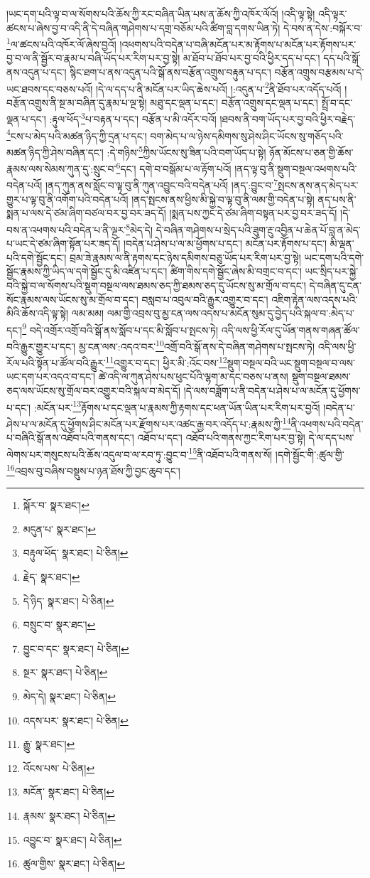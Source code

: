 །ཡང་དག་པའི་ལྟ་བ་ལ་སོགས་པའི་ཆོས་ཀྱི་རང་བཞིན་ཡིན་པས་ན་ཆོས་ཀྱི་འཁོར་ལོའོ། །འདི་ལྟ་སྟེ། འདི་ལྟར་ཚངས་པ་ཞེས་བྱ་བ་འདི་ནི་དེ་བཞིན་གཤེགས་པ་དགྲ་བཅོམ་པའི་ཚིག་བླ་དགས་ཡིན་ཏེ། དེ་བས་ན་དེས་:བསྐོར་བ་\footnote{སྐོར་བ་  སྣར་ཐང་། }ལ་ཚངས་པའི་འཁོར་ལོ་ཞེས་བྱའོ། །འཕགས་པའི་བདེན་པ་བཞི་མངོན་པར་མ་རྟོགས་པ་མངོན་པར་རྟོགས་པར་བྱ་བ་ལ་ནི་སྦྱོར་བ་རྣམ་པ་བཞི་ཡོད་པར་རིག་པར་བྱ་སྟེ། མ་ཐོབ་པ་ཐོབ་པར་བྱ་བའི་ཕྱིར་དད་པ་དང་། དད་པའི་སྒོ་ནས་འདུན་པ་དང་། སྙིང་ཐག་པ་ནས་འདུན་པའི་སྒོ་ནས་བརྩོན་འགྲུས་བརྟུན་པ་དང་། བརྩོན་འགྲུས་བརྩམས་པ་དེ་ཡང་ཐབས་དང་བཅས་པའོ། །དེ་ལ་དད་པ་ནི་མངོན་པར་ཡིད་ཆེས་པའོ། །:འདུན་པ་\footnote{མདུན་པ་  སྣར་ཐང་། }ནི་ཐོབ་པར་འདོད་པའོ། །
བརྩོན་འགྲུས་ནི་སྔ་མ་བཞིན་དུ་རྣམ་པ་ལྔ་སྟེ། མཐུ་དང་ལྡན་པ་དང་། བརྩོན་འགྲུས་དང་ལྡན་པ་དང་། སྤྲོ་བ་དང་ལྡན་པ་དང་། :རྟུལ་ཕོད་\footnote{བརྟུལ་ཕོད་  སྣར་ཐང་།  པེ་ཅིན། }པ་བརྟན་པ་དང་། བརྩོན་པ་མི་འདོར་བའོ། །ཐབས་ནི་བག་ཡོད་པར་བྱ་བའི་ཕྱིར་བརྗེད་\footnote{རྗེད་  སྣར་ཐང་། }ངས་པ་མེད་པའི་མཚན་ཉིད་ཀྱི་དྲན་པ་དང་། བག་མེད་པ་ལ་ཉེས་དམིགས་སུ་ཤེས་ཤིང་ཡོངས་སུ་གཅོད་པའི་མཚན་ཉིད་ཀྱི་ཤེས་བཞིན་དང་། :དེ་གཉིས་\footnote{དེ་ཉིད་  སྣར་ཐང་།  པེ་ཅིན། }ཀྱིས་ཡོངས་སུ་ཟིན་པའི་བག་ཡོད་པ་སྟེ། ཉོན་མོངས་པ་ཅན་གྱི་ཆོས་རྣམས་ལས་སེམས་ཀུན་དུ་:སྲུང་བ་\footnote{བསྲུང་བ་  སྣར་ཐང་། }དང་། དགེ་བ་བསྒོམ་པ་ལ་རྟོག་པའོ། །ནད་ལྟ་བུ་ནི་སྡུག་བསྔལ་འཕགས་པའི་བདེན་པའོ། །ནད་ཀུན་ནས་སློང་བ་ལྟ་བུ་ནི་ཀུན་འབྱུང་བའི་བདེན་པའོ། །ནད་:བྱུང་བ་\footnote{བྱུང་བ་དང་  སྣར་ཐང་།  པེ་ཅིན། }སྤངས་ནས་ནད་མེད་པར་གྱུར་པ་ལྟ་བུ་ནི་འགོག་པའི་བདེན་པའོ། །ནད་སྤངས་ནས་ཕྱིས་མི་སྐྱེ་བ་ལྟ་བུ་ནི་ལམ་གྱི་བདེན་པ་སྟེ། ནད་པས་ནི་སྨན་པ་ལས་དེ་ཙམ་ཞིག་བཙལ་བར་བྱ་བར་ཟད་དོ། །སྨན་པས་ཀྱང་དེ་ཙམ་ཞིག་བསྟན་པར་བྱ་བར་ཟད་དོ། །དེ་བས་ན་འཕགས་པའི་བདེན་པ་ནི་ལྔར་\footnote{སྔར་  སྣར་ཐང་།  པེ་ཅིན། }མེད་དེ། དེ་བཞིན་གཤེགས་པ་སྲེད་པའི་ཟུག་རྔུ་འབྱིན་པ་ཆེན་པོ་བླ་ན་མེད་པ་ཡང་དེ་ཙམ་ཞིག་སྟོན་པར་ཟད་དོ། །བདེན་པ་ཤེས་པ་ལ་མ་ཕྱོགས་པ་དང་། མངོན་པར་རྟོགས་པ་དང་། མི་ལྡན་པའི་དགེ་སྦྱོང་དང་། བྲམ་ཟེ་རྣམས་ལ་ནི་རྟགས་དང་ཉེས་དམིགས་བཅུ་ཡོད་པར་རིག་པར་བྱ་སྟེ། ཡང་དག་པའི་དགེ་སྦྱོང་རྣམས་ཀྱི་ཡིད་ལ་དགེ་སྦྱོང་དུ་མི་འཛིན་པ་དང་། ཚིག་གིས་དགེ་སྦྱོང་ཞེས་མི་བགྲང་བ་དང་། ཡང་སྲིད་པར་སྐྱེ་བའི་སྐྱེ་བ་ལ་སོགས་པའི་སྡུག་བསྔལ་ལས་ཐམས་ཅད་ཀྱི་ཐམས་ཅད་དུ་ཡོངས་སུ་མ་གྲོལ་བ་དང་། དེ་བཞིན་དུ་ངན་སོང་རྣམས་ལས་ཡོངས་སུ་མ་གྲོལ་བ་དང་། བསླབ་པ་འབུལ་བའི་རྒྱུར་འགྱུར་བ་དང་། འཇིག་རྟེན་ལས་འདས་པའི་མིའི་ཆོས་འདི་ལྟ་སྟེ། ལམ་མམ། ལམ་གྱི་འབྲས་བུ་མྱ་ངན་ལས་འདས་པ་མངོན་སུམ་དུ་བྱེད་པའི་སྐལ་བ་:མེད་པ་དང་།\footnote{མེད་དེ།  སྣར་ཐང་།  པེ་ཅིན། } བདེ་འགྲོར་འགྲོ་བའི་སྒོ་ནས་སློབ་པ་དང་མི་སློབ་པ་སྤངས་ཏེ། འདི་ལས་ཕྱི་རོལ་དུ་ཡོན་གནས་གཞན་ཚོལ་བའི་རྒྱུར་གྱུར་པ་དང་། མྱ་ངན་ལས་:འདའ་བར་\footnote{འདས་པར་  སྣར་ཐང་།  པེ་ཅིན། }འགྲོ་བའི་སྒོ་ནས་དེ་བཞིན་གཤེགས་པ་སྤངས་ཏེ། འདི་ལས་ཕྱི་རོལ་པའི་སྟོན་པ་ཚོལ་བའི་རྒྱུར་\footnote{རྒྱུ་  སྣར་ཐང་། }འགྱུར་བ་དང་། ཕྱིར་མི་:འོང་བས་\footnote{འོངས་པས་  པེ་ཅིན། }སྡུག་བསྔལ་བའི་ཡང་སྡུག་བསྔལ་བ་ལས་ཡང་དག་པར་འདའ་བ་དང་། ཚེ་འདི་ལ་ཀུན་ཤེས་པས་ཕུང་པོའི་ལྷག་མ་དང་བཅས་པ་ནས། སྡུག་བསྔལ་ཐམས་ཅད་ལས་ཡོངས་སུ་གྲོལ་བར་འགྱུར་བའི་སྐལ་བ་མེད་དོ། །དེ་ལས་བཟློག་པ་ནི་བདེན་པ་ཤེས་པ་ལ་མངོན་དུ་ཕྱོགས་པ་དང་། :མངོན་པར་\footnote{མངོན་  སྣར་ཐང་།  པེ་ཅིན། }རྟོགས་པ་དང་ལྡན་པ་རྣམས་ཀྱི་རྟགས་དང་ཕན་ཡོན་ཡིན་པར་རིག་པར་བྱའོ། །བདེན་པ་ཤེས་པ་ལ་མངོན་དུ་ཕྱོགས་ཤིང་མངོན་པར་རྫོགས་པར་འཚང་རྒྱ་བར་འདོད་པ་:རྣམས་ཀྱི་\footnote{རྣམས་  སྣར་ཐང་།  པེ་ཅིན། }ནི་འཕགས་པའི་བདེན་པ་བཞིའི་སྒོ་ནས་འཐོབ་པའི་གནས་དང་། འཐོབ་པ་དང་། འཐོབ་པའི་གནས་ཀྱང་རིག་པར་བྱ་སྟེ། དེ་ལ་དད་པས་ལེགས་པར་གསུངས་པའི་ཆོས་འདུལ་བ་ལ་རབ་ཏུ་:བྱུང་བ་\footnote{འབྱུང་བ་  སྣར་ཐང་།  པེ་ཅིན། }ནི་འཐོབ་པའི་གནས་སོ། །དགེ་སྦྱོང་གི་:ཚུལ་གྱི་\footnote{ཚུལ་གྱིས་  སྣར་ཐང་།  པེ་ཅིན། }འབྲས་བུ་བཞིས་བསྡུས་པ་ཉན་ཐོས་ཀྱི་བྱང་ཆུབ་དང་། 